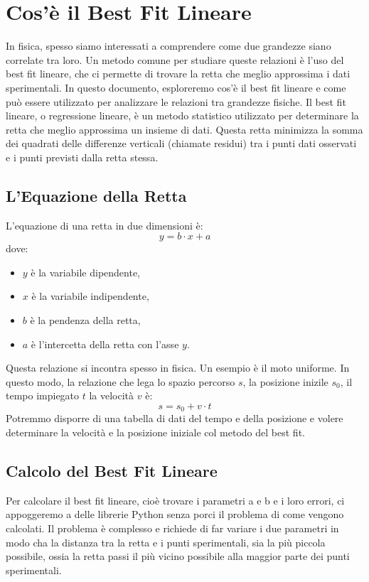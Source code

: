 \documentclass[a4paper,12pt]{article}
\begin{document}
\section{Cos'è il Best Fit Lineare}
In fisica, spesso siamo interessati a comprendere come due grandezze siano correlate tra loro. Un metodo comune per studiare queste relazioni è l'uso del best fit lineare, che ci permette di trovare la retta che meglio approssima i dati sperimentali. In questo documento, esploreremo cos'è il best fit lineare e come può essere utilizzato per analizzare le relazioni tra grandezze fisiche.
Il best fit lineare, o regressione lineare, è un metodo statistico utilizzato per determinare la retta che meglio approssima un insieme di dati. Questa retta minimizza la somma dei quadrati delle differenze verticali (chiamate residui) tra i punti dati osservati e i punti previsti dalla retta stessa.

\subsection{L'Equazione della Retta}
L'equazione di una retta in due dimensioni è:
\[
y = b\cdot x + a
\]
dove:
\begin{itemize}
    \item \(y\) è la variabile dipendente,
    \item \(x\) è la variabile indipendente,
    \item \(b\) è la pendenza della retta,
    \item \(a\) è l'intercetta della retta con l'asse \(y\).
\end{itemize}
Questa relazione si incontra spesso in fisica. Un esempio è il moto uniforme. In questo modo, la relazione che lega lo spazio percorso $s$, la posizione inizile $s_0$, il tempo impiegato $t$  la velocità $v$ è:
\[
s=s_0 + v\cdot t
\]
Potremmo disporre di una tabella di dati del tempo e della posizione e volere determinare la velocità e la posizione iniziale col metodo del best fit.

\subsection{Calcolo del Best Fit Lineare}
Per calcolare il best fit lineare, cioè trovare i parametri a e b e i loro errori, ci appoggeremo a delle librerie Python senza porci il problema di come vengono calcolati. Il problema è complesso e richiede di far variare i due parametri in modo cha la  distanza tra la retta e i punti sperimentali, sia la più piccola possibile, ossia la retta passi il più vicino possibile alla maggior parte dei punti sperimentali.
\end{document}
